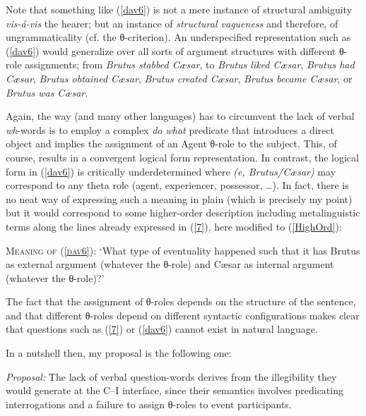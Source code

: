 \documentclass[output=paper]{langsci/langscibook}
\begin{document}
Note that something like (\ref{dav6}) is not a mere instance of structural
ambiguity \emph{vis-\'a-vis} the hearer; but an instance of
\emph{structural vagueness} and therefore, of ungrammaticality (cf.
the θ-criterion). An underspecified representation such as (\ref{dav6})
would generalize over all sorts of argument structures with different
θ-role assignments; from \emph{Brutus stabbed C\ae{}sar}, to
\emph{Brutus liked C\ae{}sar}, \emph{Brutus had C\ae{}sar}, \emph{Brutus
obtained C\ae{}sar}, \emph{Brutus created C\ae{}sar}, \emph{Brutus became
C\ae{}sar}, or \emph{Brutus was C\ae{}sar}.

Again, the way  (and many other languages) has to circumvent the lack of
verbal \emph{wh}-words is to employ a complex \emph{do what} predicate that
introduces a direct object and implies the assignment of an Agent θ-role to the
subject. This, of course, results in a convergent logical form representation.
In contrast, the logical form in (\ref{dav6}) is critically underdetermined
where \emph{\underline{\hspace{1cm}}(e, Brutus/C\ae{}sar)} may correspond to
any theta role (agent, experiencer, possessor, \ldots). In fact, there is no neat
way of expressing such a meaning in plain  (which is precisely my point)
but it would correspond to some higher-order description including
metalinguistic terms along the lines already expressed in (\ref{7}), here
modified to (\ref{HighOrd}):

\begin{exe}
\ex \label{HighOrd} \textsc{Meaning of (\ref{dav6})}: `What type of eventuality happened such that it has Brutus as external argument (whatever the θ-role) and C\ae{}sar as internal argument (whatever the θ-role)?'
\end{exe}

The fact that the assignment of θ-roles depends on the structure of the sentence, and that different θ-roles depend on different syntactic configurations makes clear that questions such as (\ref{7}) or (\ref{dav6}) cannot exist in natural language.

In a nutshell then, my proposal is the following one:

\begin{exe}
\ex \label{prop} \emph{Proposal:} The lack of verbal question-words derives
from the illegibility they would generate at the C--I interface, since their semantics involves predicating interrogations and a failure to assign θ-roles to event participants.
\end{exe}
\end{document}
